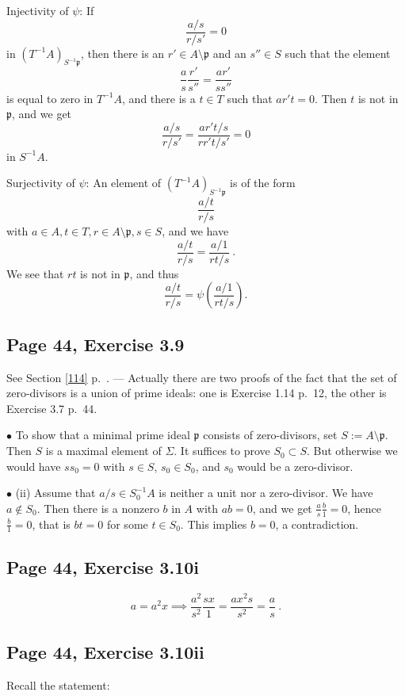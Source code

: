 \documentclass[parskip=half,fontsize=12pt]{scrartcl}%
\newcommand{\mf}{\mathfrak}
\newcommand{\ppp}{\mf p}
\newcommand{\bu}{\bullet}
\begin{document}
Injectivity of $\psi$: If 
$$
\frac{a/s}{r/s'}=0
$$ 
in $(T^{-1}A)_{S^{-1}\ppp}$, then there is an $r'\in A\setminus\ppp$ and an $s''\in S$ such that the element 
$$
\frac{a}{s}\frac{r'}{s''}=\frac{ar'}{ss''}
$$ 
is equal to zero in $T^{-1}A$, and there is a $t\in T$ such that $ar't=0$. Then $t$ is not in $\ppp$, and we get %
$$
\frac{a/s}{r/s'}=\frac{ar't/s}{rr't/s'}=0
$$ 
in $S^{-1}A$.

Surjectivity of $\psi$: An element of $(T^{-1}A)_{S^{-1}\ppp}$ is of the form 
$$
\frac{a/t}{r/s}
$$ 
with $a\in A,t\in T,r\in A\setminus\ppp, s\in S$, and we have 
$$
\frac{a/t}{r/s}=\frac{a/1}{rt/s}\ .
$$ 
We see that $rt$ is not in $\ppp$, and thus 
$$
\frac{a/t}{r/s}=\psi\left(\frac{a/1}{rt/s}\right).
$$

\subsection{Page 44, Exercise 3.9}%

See Section \ref{114} p.~\pageref{114}. --- Actually there are two proofs of the fact that the set of zero-divisors  is a union of prime ideals: one is Exercise 1.14 p.~12, the other is Exercise 3.7 p.~44.

$\bu$ To show that a minimal prime ideal $\ppp$ consists of zero-divisors, set $S:=A\setminus\ppp$. Then $S$ is a maximal element of $\Sigma$. It suffices to prove $S_0\subset S$. But otherwise we would have $ss_0=0$ with $s\in S$, $s_0\in S_0$, and $s_0$ would be a zero-divisor.

$\bu$ (ii) Assume that $a/s\in S_0^{-1}A$ is neither a unit nor a zero-divisor. We have $a\notin S_0$. Then there is a nonzero $b$ in $A$ with $ab=0$, and we get $\frac as\frac b1=0$, hence $\frac b1=0$, that is $bt=0$ for some $t\in S_0$. This implies $b=0$, a contradiction.

\subsection{Page 44, Exercise 3.10i}%

$$a=a^2x\implies\frac{a^2}{s^2}\frac{sx}1=\frac{ax^2s}{s^2}=\frac as\ .$$ 

\subsection{Page 44, Exercise 3.10ii}\label{310ii}%

Recall the statement: 
\end{document}
